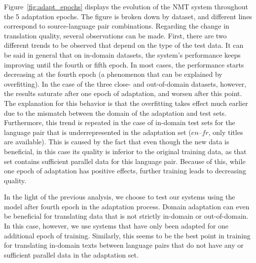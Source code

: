 \documentclass[a4paper,11pt]{article}
\begin{document}
Figure~\ref{fig:adapt_epochs} displays the evolution of the NMT system throughout the 5 adaptation epochs. The figure is broken down by dataset, and different lines correspond to source-language pair combinations. Regarding the change in translation quality, several observations can be made. First, there are two different trends to be observed that depend on the type of the test data. It can be said in general that on in-domain datasets, the system's performance keeps improving until the fourth or fifth epoch. In most cases, the performance starts decreasing at the fourth epoch (a phenomenon that can be explained by overfitting). In the case of the three close- and out-of-domain datasets, however, the results saturate after one epoch of adaptation, and worsen after this point. The explanation for this behavior is that the overfitting takes effect much earlier due to the mismatch between the domain of the adaptation and test sets. Furthermore, this trend is repeated in the case of in-domain test sets for the language pair that is underrepresented in the adaptation set ($en$--$fr$, only titles are available). This is caused by the fact that even though the new data is beneficial, in this case its quality is inferior to the original training data, as that set contains sufficient parallel data for this language pair. Because of this, while one epoch of adaptation has positive effects, further training leads to decreasing quality.

In the light of the previous analysis, we choose to test our systems using the model after fourth epoch in the adaptation process. Domain adaptation can even be beneficial for translating data that is not strictly in-domain or out-of-domain. In this case, however, we use systems that have only been adapted for one additional epoch of training. Similarly, this seems to be the best point in training for translating in-domain texts between language pairs that do not have any or sufficient parallel data in the adaptation set.
\end{document}
